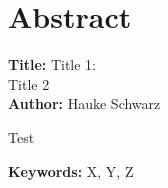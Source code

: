 \chapter{Abstract}\label{chap:abstract}

\noindent
\textbf{Title:} Title 1: \\
Title 2\\ 
\textbf{Author:} Hauke Schwarz
\vspace{1em}


Test


\vspace{3em}

\textbf{Keywords:} X, Y, Z \\